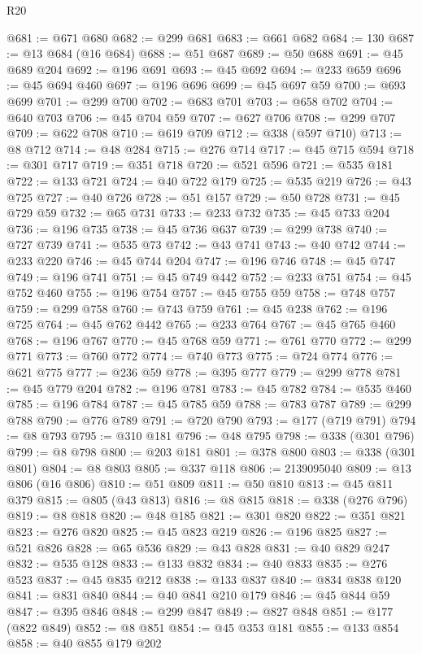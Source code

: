 \begin{lexlean}{R20}
\begin{coremodule}
@681 := @671 @680
@682 := @299 @681
@683 := @661 @682
@684 := 130
@687 := @13 @684 (@16 @684)
@688 := @51 @687
@689 := @50 @688
@691 := @45 @689 @204
@692 := @196 @691
@693 := @45 @692
@694 := @233 @659
@696 := @45 @694 @460
@697 := @196 @696
@699 := @45 @697 @59
@700 := @693 @699
@701 := @299 @700
@702 := @683 @701
@703 := @658 @702
@704 := @640 @703
@706 := @45 @704 @59
@707 := @627 @706
@708 := @299 @707
@709 := @622 @708
@710 := @619 @709
@712 := @338 (@597 @710)
@713 := @8 @712
@714 := @48 @284
@715 := @276 @714
@717 := @45 @715 @594
@718 := @301 @717
@719 := @351 @718
@720 := @521 @596
@721 := @535 @181
@722 := @133 @721
@724 := @40 @722 @179
@725 := @535 @219
@726 := @43 @725
@727 := @40 @726
@728 := @51 @157
@729 := @50 @728
@731 := @45 @729 @59
@732 := @65 @731
@733 := @233 @732
@735 := @45 @733 @204
@736 := @196 @735
@738 := @45 @736 @637
@739 := @299 @738
@740 := @727 @739
@741 := @535 @73
@742 := @43 @741
@743 := @40 @742
@744 := @233 @220
@746 := @45 @744 @204
@747 := @196 @746
@748 := @45 @747
@749 := @196 @741
@751 := @45 @749 @442
@752 := @233 @751
@754 := @45 @752 @460
@755 := @196 @754
@757 := @45 @755 @59
@758 := @748 @757
@759 := @299 @758
@760 := @743 @759
@761 := @45 @238
@762 := @196 @725
@764 := @45 @762 @442
@765 := @233 @764
@767 := @45 @765 @460
@768 := @196 @767
@770 := @45 @768 @59
@771 := @761 @770
@772 := @299 @771
@773 := @760 @772
@774 := @740 @773
@775 := @724 @774
@776 := @621 @775
@777 := @236 @59
@778 := @395 @777
@779 := @299 @778
@781 := @45 @779 @204
@782 := @196 @781
@783 := @45 @782
@784 := @535 @460
@785 := @196 @784
@787 := @45 @785 @59
@788 := @783 @787
@789 := @299 @788
@790 := @776 @789
@791 := @720 @790
@793 := @177 (@719 @791)
@794 := @8 @793
@795 := @310 @181
@796 := @48 @795
@798 := @338 (@301 @796)
@799 := @8 @798
@800 := @203 @181
@801 := @378 @800
@803 := @338 (@301 @801)
@804 := @8 @803
@805 := @337 @118
@806 := 2139095040
@809 := @13 @806 (@16 @806)
@810 := @51 @809
@811 := @50 @810
@813 := @45 @811 @379
@815 := @805 (@43 @813)
@816 := @8 @815
@818 := @338 (@276 @796)
@819 := @8 @818
@820 := @48 @185
@821 := @301 @820
@822 := @351 @821
@823 := @276 @820
@825 := @45 @823 @219
@826 := @196 @825
@827 := @521 @826
@828 := @65 @536
@829 := @43 @828
@831 := @40 @829 @247
@832 := @535 @128
@833 := @133 @832
@834 := @40 @833
@835 := @276 @523
@837 := @45 @835 @212
@838 := @133 @837
@840 := @834 @838 @120
@841 := @831 @840
@844 := @40 @841 @210 @179
@846 := @45 @844 @59
@847 := @395 @846
@848 := @299 @847
@849 := @827 @848
@851 := @177 (@822 @849)
@852 := @8 @851
@854 := @45 @353 @181
@855 := @133 @854
@858 := @40 @855 @179 @202

\end{coremodule}
\end{lexlean}
